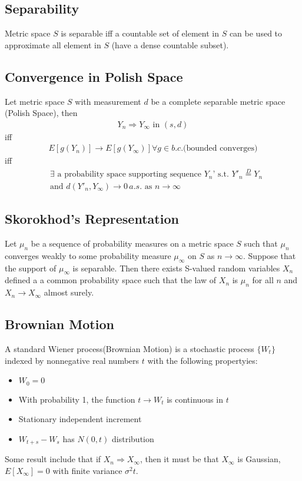 \subsection{Separability} 
Metric space $S$ is separable iff a countable set of element in $S$ can be used to approximate all element in $S$ (have a dense countable subset). 



\subsection{Convergence in Polish Space} 
Let metric space $S$ with measurement $d$ be a complete separable metric space (Polish Space), then 
    \begin{align*}
        Y_n \Rightarrow Y_\infty \text{ in } (s,d)
    \end{align*}
iff
    \begin{align*}
        E[g(Y_n)] \to E[g(Y_\infty)] \forall g\in b.c. \text{(bounded converges)}
    \end{align*}
iff 
    \begin{align*}
        & \exists \text{ a probability space supporting sequence $Y_n$' s.t. } Y'_n \overset{D}{=} Y_n \\
        & \text{and } d(Y'_n, Y_\infty) \to 0 \, a.s. \text{ as $n \to \infty$}
    \end{align*}

\subsection{Skorokhod's Representation}
Let $\mu_n$ be a sequence of probability measures on a metric space $S$ such that $\mu_n$ converges weakly to some probability measure $\mu_\infty$ on $S$ as $n \to \infty$. Suppose that the support of $\mu_\infty$ is separable. Then there exists S-valued random variables $X_n$ defined a a common probability space such that the law of $X_n$ is $\mu_n$ for all $n$ and $X_n \to X_\infty$ almost surely. 

\subsection{Brownian Motion}
A standard Wiener process(Brownian Motion) is a stochastic process $\{W_t\}$ indexed by nonnegative real numbers $t$ with the following propertyies: 
    \begin{itemize}
        \item $W_0 = 0$
        \item With probability 1, the function $t \to W_t$ is continuous in $t$ 
        \item Stationary independent increment 
        \item $W_{t+s} - W_{s}$ has $N(0, t)$ distribution 
    \end{itemize}
Some result include that if $X_n \Rightarrow X_\infty$, then it must be that $X_\infty$ is Gaussian, $E[X_\infty] = 0$ with finite variance $\sigma^2 t$. \\


